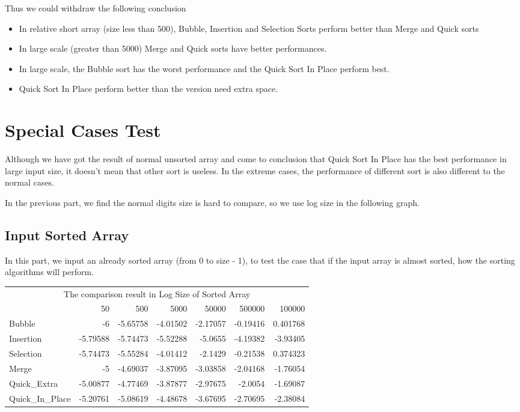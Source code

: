 \documentclass{article}
\begin{document}
Thus we could withdraw the following conclusion

\begin{itemize}
    \item In relative short array (size less than 500), Bubble, Insertion and Selection Sorts perform better than Merge and Quick sorts
    \item In large scale (greater than 5000) Merge and Quick sorts have better performances.
    \item In large scale, the Bubble sort has the worst performance and the Quick Sort In Place perform best.
    \item Quick Sort In Place perform better than the version need extra space.
\end{itemize}

\section{Special Cases Test}
Although we have got the result of normal unsorted array and come to conclusion that Quick Sort In Place has the best performance in large input size, it doesn't mean that other sort is useless. In the extreme cases, the performance of different sort is also different to the normal cases. 

In the previous part, we find the normal digits size is hard to compare, so we use log size in the following graph.

\subsection{Input Sorted Array}
In this part, we input an already sorted array (from 0 to size - 1), to test the case that if the input array is almost sorted, how the sorting algorithms will perform.

\begin{table}[H]
  \centering
    \begin{tabular}{l|rrrrrr}
    \multicolumn{7}{c}{The comparison result in Log Size of Sorted Array} \\
          & 50    & 500   & 5000  & 50000  & 500000  & 100000  \\ \hline
    Bubble & -6    & -5.65758 & -4.01502 & -2.17057 & -0.19416 & 0.401768 \\
    Insertion & -5.79588 & -5.74473 & -5.52288 & -5.0655 & -4.19382 & -3.93405 \\
    Selection & -5.74473 & -5.55284 & -4.01412 & -2.1429 & -0.21538 & 0.374323 \\
    Merge & -5    & -4.69037 & -3.87095 & -3.03858 & -2.04168 & -1.76054 \\
    Quick\_Extra & -5.00877 & -4.77469 & -3.87877 & -2.97675 & -2.0054 & -1.69087 \\
    Quick\_In\_Place & -5.20761 & -5.08619 & -4.48678 & -3.67695 & -2.70695 & -2.38084 \\
    \end{tabular}%
  \label{tab:addlabel}%
\end{table}%
\end{document}
